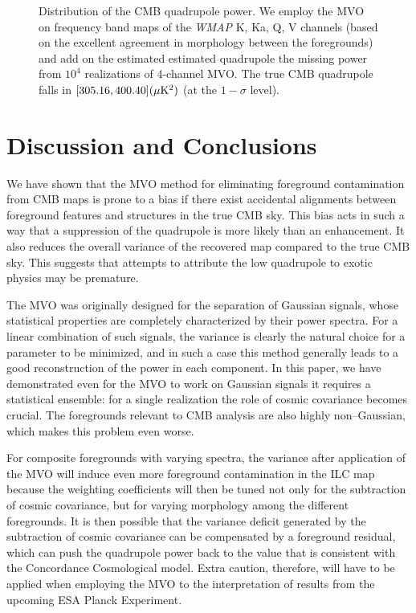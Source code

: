 \documentclass{emulateapj}
\def\wmap{{\sl WMAP }}
\begin{document}
\begin{figure}
\caption{Distribution of the CMB quadrupole power.
We employ the MVO on frequency band maps of the \wmap K, Ka, Q, V channels
(based on the excellent agreement in morphology between the foregrounds)
and add on the estimated estimated quadrupole the missing power from $10^4$ realizations of 4-channel MVO. The true CMB quadrupole falls in $[305.16,400.40] (\mu {\rm K}^2)$ (at the $1-\sigma$ level).}
\label{quadrupoledis}
\end{figure}

\section{Discussion and Conclusions}
We have shown that the MVO method for eliminating foreground
contamination from CMB maps is prone to a bias if there exist
accidental alignments between foreground features and structures in
the true CMB sky. This bias acts in such a way that a suppression of
the quadrupole is more likely than an enhancement. It also reduces
the overall variance of the recovered map compared to the true CMB
sky. This suggests that attempts to attribute the low quadrupole to
exotic physics may be premature.

The MVO was originally designed for the separation of Gaussian
signals, whose statistical properties are completely characterized
by their power spectra. For a linear combination of such signals,
the variance is clearly the natural choice for a parameter to be
minimized, and in such a case this method generally leads to a good
reconstruction of the power in each component. In this paper, we
have demonstrated even for the MVO to work on Gaussian signals it
requires a statistical ensemble: for a single realization the role
of cosmic covariance becomes crucial. The foregrounds relevant to
CMB analysis are also highly non--Gaussian, which makes this problem
even worse.

For composite foregrounds with varying spectra, the variance after
application of the MVO will induce even more foreground
contamination in the ILC map because the weighting coefficients will then be tuned
not only for the subtraction of cosmic covariance, but for varying
morphology among the different foregrounds. It is then possible that
the variance deficit generated by the subtraction of cosmic
covariance can be compensated by a foreground residual, which can
push the quadrupole power back to the value that is consistent with
the Concordance Cosmological model. Extra caution, therefore, will
have to be applied when employing the MVO to the interpretation of
results from the upcoming ESA Planck Experiment.
\end{document}
